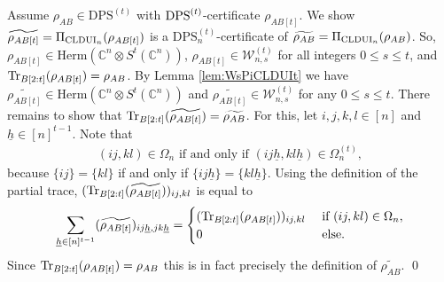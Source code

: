 \documentclass[11pt]{article}
\makeatletter
\newcommand{\C}{\ensuremath{\mathbb{C}}} %
\newcommand{\Perm}{\mathfrak G}
\newcommand{\MV}{{\mathcal V}}
\newcommand{\MW}{{\mathcal W}}
\newcommand{\Herm}{\mathrm{Herm}}
\newcommand{\CLDUI}{\text{\rm CLDUI}}
\newcommand{\DPS}{\text{\rm DPS}}
\newcommand{\DPSt}{\mathrm{DPS}^{(t)}}
\newcommand{\Tr}{\text{\rm Tr}}
\newcommand{\ot}{\otimes}
\newcommand{\ui}{\underline{i}}
\newcommand{\uj}{\underline{j}}
\newcommand{\uh}{\underline{h}}
\theoremstyle{plain}
\renewenvironment{proof}[1][\proofname]{%
  \par
  \pushQED{}%
  \normalfont
  \topsep6\p@\@plus6\p@
  \trivlist
  \item[\hskip\labelsep\itshape #1\@addpunct{.}]%
}{%
  \popQED
  \endtrivlist
}
\makeatother
\begin{document}
\begin{proof}[Proof of Theorem \ref{theo:CLDUItDPSCert}]
Assume  $\rho_{AB}\in\DPSt$ with $\DPS^{(t)}$-certificate $\rho_{AB[t]}$. 
We show $\widetilde{{\rho}_{AB[t]}}= \Pi_{\CLDUI_n}(\rho_{AB[t]})$ is a $\DPSt_n$-certificate of $\widetilde{{\rho}_{AB}}=\Pi_{\CLDUI_n}(\rho_{AB}) $. So,  $\rho_{AB[t]}\in \Herm(\C^n\ot S^t(\C^n))$,
   $\rho_{AB[t]}\in \MW^{(t)}_{n,s}$ for all integers $0\leq s\leq t$, and   $\Tr_{B[2:t]}(\rho_{AB[t]})=\rho_{AB}$. 
 By   Lemma \ref{lem:WsPiCLDUIt} we have $\widetilde{{\rho}_{AB[t]}}\in \Herm(\C^n\ot S^t(\C^n))$ 
 and $\widetilde{{\rho}_{AB[t]}}\in\MW^{(t)}_{n,s}$ for any $0\leq s\leq t$. 
%              
 There remains to show that $\Tr_{B[2:t]}(\widetilde{{\rho}_{AB[t]}})=\widetilde{{\rho}_{AB}}$. For this, let $i,j,k,l\in[n]$ and $\uh\in[n]^{t-1}$. Note that 
    \begin{align}\label{eq:DiagOmegat}
        (ij,kl)\in\Omega_n \text{ if and only if } (ij\uh,kl\uh)\in\Omega^{(t)}_n,  
    \end{align}
    because $\{ij\}=\{kl\}$ if and only if $\{ij\uh\}=\{kl\uh\}$. Using the definition of the partial trace, 
    $(\Tr_{B[2:t]}(\widetilde{{\rho}_{AB[t]}}))_{ij,kl}$ is equal to
   $$ \sum_{\uh\in[n]^{t-1}}(\widetilde{{\rho}_{AB[t]}})_{ij\uh,jk\uh}=\begin{cases}
        (\Tr_{B[2:t]}(\rho_{AB[t]}))_{ij,kl}&\text{ if }(ij,kl)\in\Omega_n,\\
        0&\text{ else.}
    \end{cases}$$
     Since $\Tr_{B[2:t]}(\rho_{AB[t]})=\rho_{AB}$ this is in fact precisely the definition of $\widetilde{{\rho}_{AB}}$.
\qed\end{proof}
\end{document}
